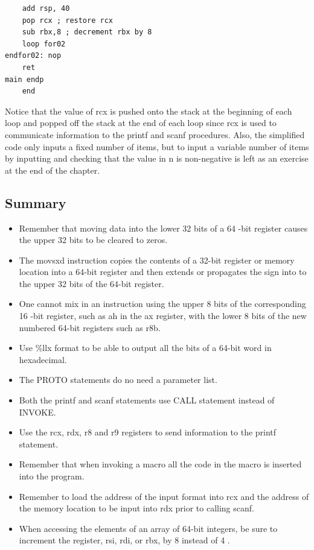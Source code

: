 \documentclass[10pt]{article}
\begin{document}
\begin{verbatim}
    add rsp, 40
    pop rcx ; restore rcx
    sub rbx,8 ; decrement rbx by 8
    loop for02
endfor02: nop
    ret
main endp
    end
\end{verbatim}

Notice that the value of rcx is pushed onto the stack at the beginning of each loop and popped off the stack at the end of each loop since rcx is used to communicate information to the printf and scanf procedures. Also, the simplified code only inputs a fixed number of items, but to input a variable number of items by inputting and checking that the value in n is non-negative is left as an exercise at the end of the chapter.

\subsection*{Summary}
\begin{itemize}
  \item Remember that moving data into the lower 32 bits of a 64 -bit register causes the upper 32 bits to be cleared to zeros.
  \item The movsxd instruction copies the contents of a 32-bit register or memory location into a 64-bit register and then extends or propagates the sign into to the upper 32 bits of the 64-bit register.
  \item One cannot mix in an instruction using the upper 8 bits of the corresponding 16 -bit register, such as ah in the ax register, with the lower 8 bits of the new numbered 64-bit registers such as r8b.
  \item Use \%llx format to be able to output all the bits of a 64-bit word in hexadecimal.
  \item The PROTO statements do no need a parameter list.
  \item Both the printf and scanf statements use CALL statement instead of INVOKE.
  \item Use the rcx, rdx, r8 and r9 registers to send information to the printf statement.
  \item Remember that when invoking a macro all the code in the macro is inserted into the program.
  \item Remember to load the address of the input format into rcx and the address of the memory location to be input into rdx prior to calling scanf.
  \item When accessing the elements of an array of 64-bit integers, be sure to increment the register, rsi, rdi, or rbx, by 8 instead of 4 .
\end{itemize}
\end{document}
